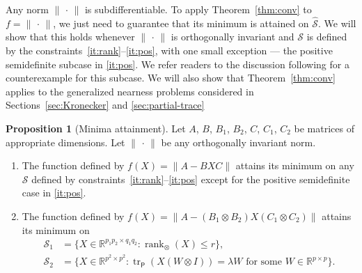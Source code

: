 \documentclass[11pt,reqno]{amsart}
\newcommand{\Par}{{\scriptscriptstyle\mathsf{P}}}
\DeclareMathOperator{\rank}{rank}
\DeclareMathOperator{\tr}{tr}
\theoremstyle{definition}
\newtheorem{proposition}[theorem]{Proposition}
\numberwithin{equation}{section}
\newcommand{\R}{\mathbb{R}}
\begin{document}
Any norm $\lVert \, \cdot \, \rVert$ is subdifferentiable. To apply Theorem~\ref{thm:conv} to $f = \lVert \, \cdot \, \rVert$, we just need to guarantee that its minimum is attained on $\widehat{\mathcal{S}}$. We will show that this holds whenever $\lVert \, \cdot \, \rVert$ is orthogonally invariant and $\mathcal{S}$ is defined by the constraints~\ref{it:rank}--\ref{it:pos}, with one small exception --- the positive semidefinite subcase in \ref{it:pos}. We refer readers to the discussion following \cite[Proposition~4.1]{li22} for a counterexample for this subcase. We will also show that Theorem~\ref{thm:conv} applies to the generalized nearness problems considered in Sections~\ref{sec:Kronecker} and  \ref{sec:partial-trace}

\begin{proposition}[Minima attainment]\label{prop:attain}
Let $ A$, $B$, $B_1$, $B_2$, $C$, $C_1$, $C_2$ be matrices of appropriate dimensions. Let $\lVert\,\cdot\,\rVert$ be any orthogonally invariant norm.
\begin{enumerate}[\upshape (a)]
\item The function defined by $f(X) = \lVert A - BXC \rVert$ attains its minimum on any $\mathcal{S}$ defined by constraints~\ref{it:rank}--\ref{it:pos} except for the positive semidefinite case in \ref{it:pos}. 

\item The function defined by $f(X) = \lVert  A- (B_1 \otimes B_2)X(C_1 \otimes C_2)  \rVert$ attains its minimum on
\begin{align*}
\mathcal{S}_1 &= \{X \in \R^{p_1p_2 \times q_1q_2}: \rank_\otimes(X) \le r\},\\
\mathcal{S}_2 &= \{X \in \R^{p^2 \times p^2}: \tr_\Par(X(W \otimes I)) = \lambda W \text{ for some } W \in \R^{p \times p}\}.
\end{align*}
\end{enumerate}
\end{proposition}
\end{document}
